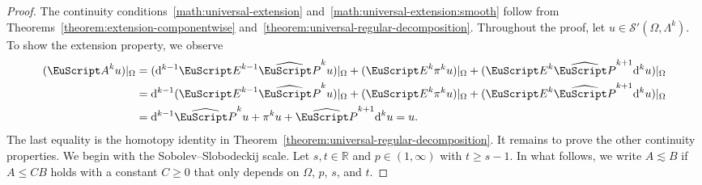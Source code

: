 \documentclass[10pt,a4paper]{amsart}
\theoremstyle{definition}
\theoremstyle{remark}
\numberwithin{equation}{section}
\newcommand{\bbR}{{\mathbb R}}
\newcommand{\calS}{{\mathcal S}}
\newcommand{\euA}{{\EuScript A}}
\newcommand{\euE}{{\EuScript E}}
\newcommand{\euP}{{\EuScript P}}
\renewcommand{\restriction}{|}
\newcommand{\cartan}{{\mathrm d}}
\newcommand{\Domain}{{\Omega}}
\newcommand{\Alt}[1]{\Lambda^{#1}}
\newcommand{\Proj}{\pi}
\newcommand{\Poincare}{\euP}
\newcommand{\Extension}{\euE}
\newcommand{\Erweiterung}{\euA}
\begin{document}
\begin{proof}
    The continuity conditions~\eqref{math:universal-extension} and~\eqref{math:universal-extension:smooth} follow from Theorems~\ref{theorem:extension-componentwise} and~\ref{theorem:universal-regular-decomposition}.
    Throughout the proof, let $u \in \calS'(\Domain,\Alt{k})$. 
    To show the extension property, we observe 
    \begin{align*}
        ( \Erweiterung^{k} u ) \restriction_{\Domain}
        &
        =
        ( \cartan^{k-1} \Extension^{k-1} \widehat\Poincare^{k} u ) \restriction_{\Domain}
        + 
        ( \Extension^{k} \Proj^{k} u ) \restriction_{\Domain}
        + 
        ( \Extension^{k} \widehat\Poincare^{k+1} \cartan^{k} u ) \restriction_{\Domain}
        \\&
        =
        \cartan^{k-1} ( \Extension^{k-1} \widehat\Poincare^{k} u ) \restriction_{\Domain}
        + 
        ( \Extension^{k} \Proj^{k} u ) \restriction_{\Domain}
        + 
        ( \Extension^{k} \widehat\Poincare^{k+1} \cartan^{k} u ) \restriction_{\Domain}
        \\&
        =
        \cartan^{k-1} \widehat\Poincare^{k} u
        + 
        \Proj^{k} u
        + 
        \widehat\Poincare^{k+1} \cartan^{k} u
        =
        u
        .
    \end{align*}
    The last equality is the homotopy identity in Theorem~\ref{theorem:universal-regular-decomposition}.
    It remains to prove the other continuity properties. 
    We begin with the Sobolev--Slobodeckij scale. 
    Let $s,t \in \bbR$ and $p \in (1,\infty)$ with $t \geq s-1$. 
    In what follows, we write $A \lesssim B$ if $A \leq C B$ holds with a constant $C \geq 0$
    that only depends on $\Domain$, $p$, $s$, and $t$. 
    

\end{proof}
\end{document}
